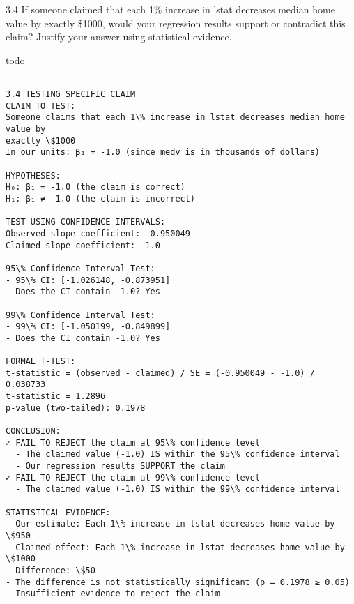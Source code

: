 \documentclass[11pt, twocolumn]{article}
\begin{document}
    3.4 If someone claimed that each 1\% increase in lstat decreases median
home value by exactly \$1000, would your regression results support or
contradict this claim? Justify your answer using statistical evidence.

todo

    \begin{Verbatim}[commandchars=\\\{\}]

3.4 TESTING SPECIFIC CLAIM
CLAIM TO TEST:
Someone claims that each 1\% increase in lstat decreases median home value by
exactly \$1000
In our units: β₁ = -1.0 (since medv is in thousands of dollars)

HYPOTHESES:
H₀: β₁ = -1.0 (the claim is correct)
H₁: β₁ ≠ -1.0 (the claim is incorrect)

TEST USING CONFIDENCE INTERVALS:
Observed slope coefficient: -0.950049
Claimed slope coefficient: -1.0

95\% Confidence Interval Test:
- 95\% CI: [-1.026148, -0.873951]
- Does the CI contain -1.0? Yes

99\% Confidence Interval Test:
- 99\% CI: [-1.050199, -0.849899]
- Does the CI contain -1.0? Yes

FORMAL T-TEST:
t-statistic = (observed - claimed) / SE = (-0.950049 - -1.0) / 0.038733
t-statistic = 1.2896
p-value (two-tailed): 0.1978

CONCLUSION:
✓ FAIL TO REJECT the claim at 95\% confidence level
  - The claimed value (-1.0) IS within the 95\% confidence interval
  - Our regression results SUPPORT the claim
✓ FAIL TO REJECT the claim at 99\% confidence level
  - The claimed value (-1.0) IS within the 99\% confidence interval

STATISTICAL EVIDENCE:
- Our estimate: Each 1\% increase in lstat decreases home value by \$950
- Claimed effect: Each 1\% increase in lstat decreases home value by \$1000
- Difference: \$50
- The difference is not statistically significant (p = 0.1978 ≥ 0.05)
- Insufficient evidence to reject the claim
    \end{Verbatim}

    \begin{center}
    \end{center}
    { \hspace*{\fill} \\}
    
\end{document}
